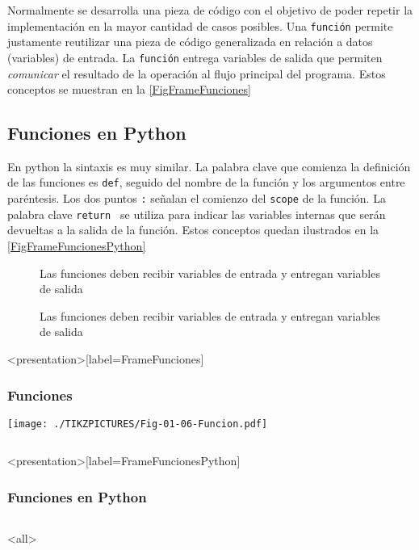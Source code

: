 
Normalmente se desarrolla una pieza de código con el objetivo
de poder repetir la implementación en la mayor cantidad de casos
posibles. Una \texttt{función} permite justamente reutilizar
una pieza de código generalizada en relación a datos (variables) de
entrada. La \texttt{función} entrega variables de salida que permiten
\emph{comunicar} el resultado de la operación al flujo principal
del programa. Estos conceptos se muestran en la \autoref{FigFrameFunciones}

\subsection{ Funciones en Python }

En python la sintaxis es muy similar. 
La palabra clave que comienza la definición de las funciones es \texttt{def}, 
seguido del nombre de la función y los argumentos entre paréntesis. 
Los dos puntos \texttt{:} señalan el comienzo del \texttt{scope} de la función.
La palabra clave  \texttt{return } se utiliza para indicar las variables internas 
que serán devueltas a la salida de la función. 
Estos conceptos quedan ilustrados en la \autoref{FigFrameFuncionesPython}

\begin{figure}

  \caption{ Las funciones deben recibir variables de entrada
  y entregan variables de salida \protect\label{FigFrameFunciones} }

\end{figure}

\begin{figure}

  \caption{ Las funciones deben recibir variables de entrada
  y entregan variables de salida \protect\label{FigFrameFuncionesPython} }

\end{figure}


\mode*
\begin{frame}<presentation>[label=FrameFunciones]
  \frametitle{Funciones}
    \texttt{[image: ./TIKZPICTURES/Fig-01-06-Funcion.pdf]}

    \begin{columns}
	
	
    \end{columns}

\end{frame}

\begin{frame}<presentation>[label=FrameFuncionesPython]
  \frametitle{Funciones en Python}

    \begin{columns}
	
	
    \end{columns}


\end{frame}
\mode<all>
